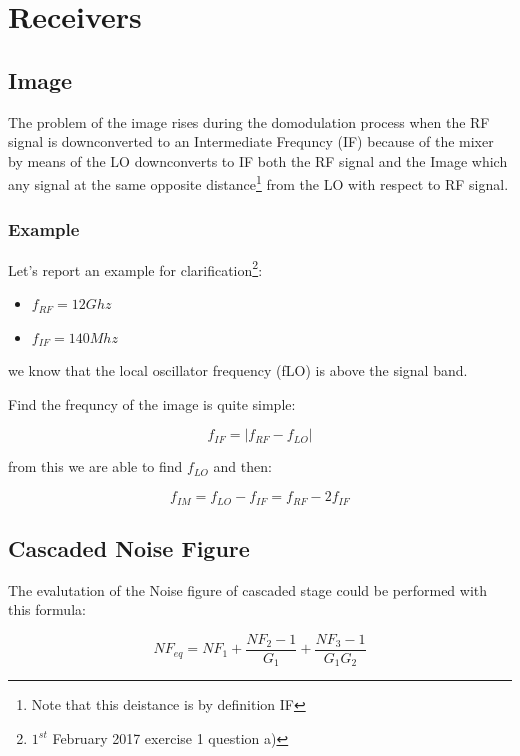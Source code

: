\chapter{Receivers} %
\label{cha:receivers}


\section{Image} %
\label{sec:image}

The problem of the image rises during the domodulation process when the RF signal is downconverted to an Intermediate Frequncy (IF) because of the mixer by means of the LO downconverts to IF both the RF signal and the Image which any signal at the same opposite distance\footnote{Note that this deistance is by definition IF} from the LO with respect to RF signal.

\subsection*{Example} %
\label{sub:example}

Let's report an example for clarification\footnote{$1^{st}$ February 2017 exercise 1 question a)}:
\begin{itemize}
	\item $f_{RF}= 12 Ghz$ 
	\item $f_{IF}= 140 Mhz$ 
\end{itemize}

we know that the local oscillator frequency (fLO) is above the signal band.

Find the frequncy of the image is quite simple:


\begin{equation}
	f_{IF}=|f_{RF}-f_{LO}|
\end{equation}

from this we are able to find $f_{LO}$ and then:

\begin{equation}
		f_{IM}=f_{LO}-f_{IF}= f_{RF}-2f_{IF}
\end{equation}

\section{Cascaded Noise Figure} %
\label{sec:cascaded_noise_figure}

The evalutation of the Noise figure of cascaded stage could be performed with this formula:

\begin{equation}
	NF_{eq}= NF_1 + \frac{NF_2-1}{G_1} + \frac{NF_3-1}{G_1G_2} 
\end{equation}






